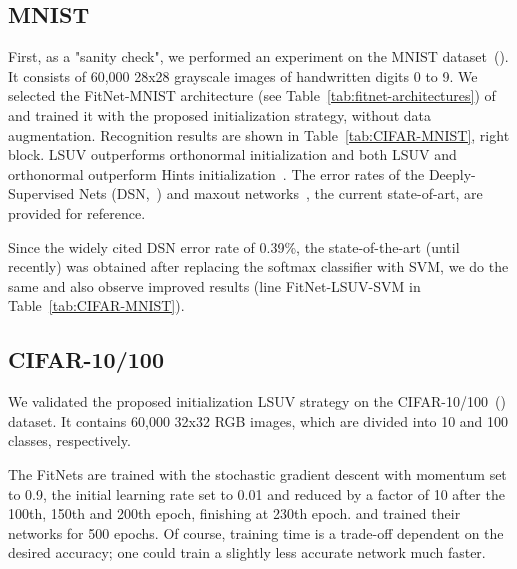 \documentclass{article} \clearpage{}\usepackage{iclr2016_conference,times}
\begin{document}
\subsection{MNIST}
First, as a "sanity check", we performed an experiment on the MNIST dataset~(\cite{MNIST1998}). It consists of 60,000 28x28 grayscale images of handwritten digits 0 to 9.
We selected the FitNet-MNIST architecture (see Table~\ref{tab:fitnet-architectures}) of~\cite{FitNets2014} and trained it with the proposed initialization strategy, without data augmentation. Recognition results are shown in Table~\ref{tab:CIFAR-MNIST}, right block.
LSUV outperforms orthonormal initialization and both LSUV and orthonormal outperform Hints initialization~\cite{FitNets2014}. 
The error rates of the Deeply-Supervised Nets (DSN,~\cite{DSN2015}) and maxout networks~\cite{Maxout2013}, the current state-of-art, are provided for reference.

Since the widely cited DSN error rate of 0.39\%, the state-of-the-art (until recently) was obtained after replacing the softmax classifier with SVM, we do the same and also observe improved results (line FitNet-LSUV-SVM in Table~\ref{tab:CIFAR-MNIST}).

\subsection{CIFAR-10/100} We validated the proposed initialization LSUV strategy on the CIFAR-10/100~(\cite{CIFAR2010}) dataset. It contains 60,000 32x32 RGB images, which are divided into 10 and 100 classes, respectively. 

The FitNets are trained with the stochastic gradient descent with momentum set to 0.9, the initial learning rate set to 0.01 and reduced by a factor of 10 after the 100th, 150th and 200th epoch, finishing at 230th epoch. \cite{Highway2015} and \cite{FitNets2014} trained their networks for 500 epochs. Of course, training time is a trade-off dependent on the desired accuracy; one could train a slightly less accurate network much faster.   
\end{document}
